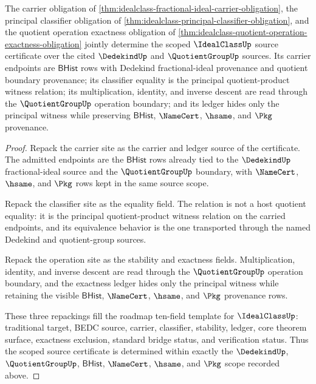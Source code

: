 \begin{theorem}\label{thm:idealclass-scoped-source-certificate}
The carrier obligation of \autoref{thm:idealclass-fractional-ideal-carrier-obligation}, the principal classifier obligation of \autoref{thm:idealclass-principal-classifier-obligation}, and the quotient operation exactness obligation of \autoref{thm:idealclass-quotient-operation-exactness-obligation} jointly determine the scoped $\IdealClassUp$ source certificate over the cited $\DedekindUp$ and $\QuotientGroupUp$ sources. Its carrier endpoints are $\mathsf{BHist}$ rows with Dedekind fractional-ideal provenance and quotient boundary provenance; its classifier equality is the principal quotient-product witness relation; its multiplication, identity, and inverse descent are read through the $\QuotientGroupUp$ operation boundary; and its ledger hides only the principal witness while preserving $\mathsf{BHist}$, $\NameCert$, $\hsame$, and $\Pkg$ provenance.
\end{theorem}
\begin{proof}
Repack the carrier site as the carrier and ledger source of the certificate. The admitted endpoints are the $\mathsf{BHist}$ rows already tied to the $\DedekindUp$ fractional-ideal source and the $\QuotientGroupUp$ boundary, with $\NameCert$, $\hsame$, and $\Pkg$ rows kept in the same source scope.

Repack the classifier site as the equality field. The relation is not a host quotient equality: it is the principal quotient-product witness relation on the carried endpoints, and its equivalence behavior is the one transported through the named Dedekind and quotient-group sources.

Repack the operation site as the stability and exactness fields. Multiplication, identity, and inverse descent are read through the $\QuotientGroupUp$ operation boundary, and the exactness ledger hides only the principal witness while retaining the visible $\mathsf{BHist}$, $\NameCert$, $\hsame$, and $\Pkg$ provenance rows.

These three repackings fill the roadmap ten-field template for $\IdealClassUp$: traditional target, BEDC source, carrier, classifier, stability, ledger, core theorem surface, exactness exclusion, standard bridge status, and verification status. Thus the scoped source certificate is determined within exactly the $\DedekindUp$, $\QuotientGroupUp$, $\mathsf{BHist}$, $\NameCert$, $\hsame$, and $\Pkg$ scope recorded above.
\end{proof}

